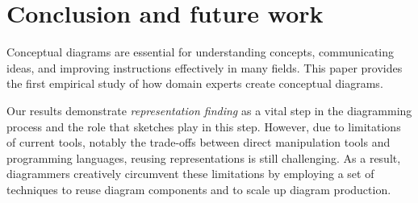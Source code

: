 

\section{Conclusion and future work}

Conceptual diagrams are essential for understanding concepts, communicating ideas, and improving instructions effectively in many fields. This paper provides the first empirical study of how domain experts create conceptual diagrams.

Our results demonstrate \emph{representation finding} as a vital step in the diagramming process and the role that sketches play in this step. However, due to limitations of current tools, notably the trade-offs between direct manipulation tools and programming languages, reusing representations is still challenging. As a result, diagrammers creatively circumvent these limitations by employing a set of  techniques to reuse diagram components and to scale up diagram production. 

